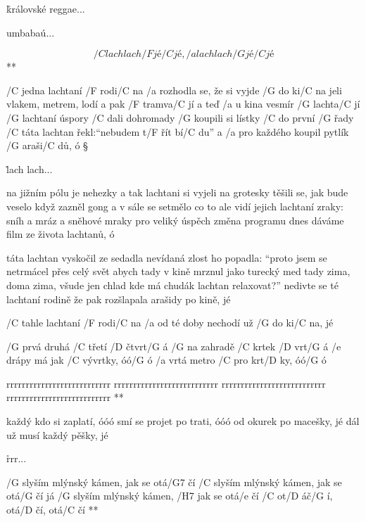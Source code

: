 \r královské reggae...

umbabaú...




\R  \[ /C lach lach /F jé /C jé, /a lach lach /G jé /C jé \] **

/C jedna lachtaní /F rodi/C na
/a rozhodla se, že si vyjde /G do ki/C na
jeli vlakem, metrem, lodí a pak /F tramva/C jí
a teď /a u kina vesmír /G lachta/C jí
/G lachtaní úspory /C dali dohromady
/G koupili si lístky /C do první /G řady
/C táta lachtan řekl:``nebudem t/F řít bí/C du''
a /a pro každého koupil pytlík /G araši/C dů, ó \S

\r  lach lach...

na jižním pólu je nehezky
a tak lachtani si vyjeli na grotesky
těšili se, jak bude veselo
když zazněl gong a v sále se setmělo
co to ale vidí jejich lachtaní zraky:
sníh a mráz a sněhové mraky
pro veliký úspěch změna programu
dnes dáváme film ze života lachtanů, ó

\rr

táta lachtan vyskočil ze sedadla
nevídaná zlost ho popadla:
``proto jsem se netrmácel přes celý svět
abych tady v kině mrznul jako turecký med
tady zima, doma zima, všude jen chlad
kde má chudák lachtan relaxovat?''
nedivte se té lachtaní rodině
že pak rozšlapala arašidy po kině, jé

\rr

/C tahle lachtaní /F rodi/C na
/a od té doby nechodí už /G do ki/C na, jé




/G prvá druhá /C třetí /D čtvrt/G á
/G na zahradě /C krtek /D vrt/G á
/e drápy má jak /C vývrtky, óó/G ó
/a vrtá metro /C pro krt/D ky, óó/G ó

\R rrrrrrrrrrrrrrrrrrrrrrrrrrr
   rrrrrrrrrrrrrrrrrrrrrrrrrrr
   rrrrrrrrrrrrrrrrrrrrrrrrrrr
   rrrrrrrrrrrrrrrrrrrrrrrrrrr **

každý kdo si zaplatí, óóó
smí se projet po trati, óóó
od okurek po macešky, jé
dál už musí každý pěšky, jé

\r rrr...




\R /G slyším mlýnský kámen, jak se otá/G7 čí
   /C slyším mlýnský kámen, jak se otá/G čí
   já /G slyším mlýnský kámen, /H7 jak se otá/e čí
   /C ot/D áč/G í, otá/D čí, otá/C čí **

